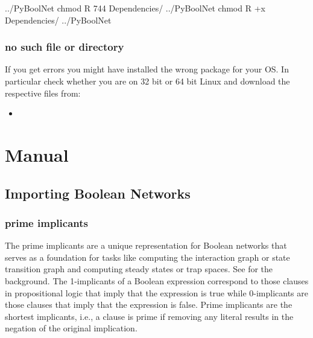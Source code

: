 \documentclass[letterpaper,10pt,english]{sphinxmanual}
\begin{document}
\begin{sphinxVerbatim}[commandchars=\\\{\}]
../PyBoolNet\PYGZdl{} chmod \PYGZhy{}R 744 Dependencies/
../PyBoolNet\PYGZdl{} chmod \PYGZhy{}R +x Dependencies/
../PyBoolNet\PYGZdl{}
\end{sphinxVerbatim}


\subsection{no such file or directory}
\label{\detokenize{Installation:no-such-file-or-directory}}
If you get  errors you might have installed the wrong package for your OS. In particular check whether you are on 32 bit or 64 bit Linux and download the respective files from:
\begin{itemize}
\item {} 

\end{itemize}


\chapter{Manual}
\label{\detokenize{Manual:manual}}\label{\detokenize{Manual:networkx-has-path}}\label{\detokenize{Manual::doc}}

\section{Importing Boolean Networks}
\label{\detokenize{Manual:importing-boolean-networks}}

\subsection{prime implicants}
\label{\detokenize{Manual:prime-implicants}}
The prime implicants are a unique representation for Boolean networks that serves as a foundation for tasks
like computing the interaction graph or state transition graph and computing steady states or trap spaces.
See {\hyperref[\detokenize{Bibliography:klarner2015trap}]{}} for the background.
The 1-implicants of a Boolean expression correspond to those clauses in propositional logic
that imply that the expression is true while 0-implicants are those clauses that imply that the expression is false.
Prime implicants are the shortest implicants, i.e.,
a clause is prime if removing any literal results in the negation of the original implication.
\end{document}
